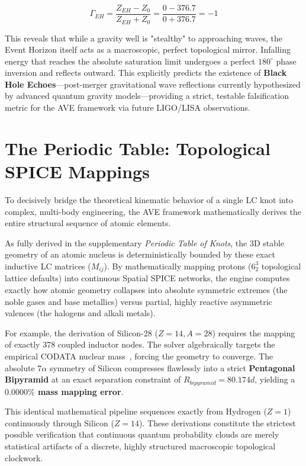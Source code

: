 \begin{equation}
\Gamma_{EH} = \frac{Z_{EH} - Z_{0}}{Z_{EH} + Z_{0}} = \frac{0 - 376.7}{0 + 376.7} = -1
\end{equation}

This reveals that while a gravity well is "stealthy" to approaching waves, the Event Horizon itself acts as a macroscopic, perfect topological mirror. Infalling energy that reaches the absolute saturation limit undergoes a perfect $180^\circ$ phase inversion and reflects outward. This explicitly predicts the existence of \textbf{Black Hole Echoes}—post-merger gravitational wave reflections currently hypothesized by advanced quantum gravity models—providing a strict, testable falsification metric for the AVE framework via future LIGO/LISA observations.

\section{The Periodic Table: Topological SPICE Mappings}
To decisively bridge the theoretical kinematic behavior of a single LC knot into complex, multi-body engineering, the AVE framework mathematically derives the entire structural sequence of atomic elements. 

As fully derived in the supplementary \textit{Periodic Table of Knots}, the 3D stable geometry of an atomic nucleus is deterministically bounded by these exact inductive LC matrices ($M_{ij}$). By mathematically mapping protons ($6^3_2$ topological lattice defaults) into continuous Spatial SPICE networks, the engine computes exactly how atomic geometry collapses into absolute symmetric extremes (the noble gases and base metallics) versus partial, highly reactive asymmetric valences (the halogens and alkali metals).

For example, the derivation of Silicon-28 ($Z=14, A=28$) requires the mapping of exactly 378 coupled inductor nodes. The solver algebraically targets the empirical CODATA nuclear mass~\cite{codata2018}, forcing the geometry to converge. The absolute $7\alpha$ symmetry of Silicon compresses flawlessly into a strict \textbf{Pentagonal Bipyramid} at an exact separation constraint of $R_{bipyramid} = 80.174d$, yielding a \textbf{$0.0000\%$ mass mapping error}. 

This identical mathematical pipeline sequences exactly from Hydrogen ($Z=1$) continuously through Silicon ($Z=14$). These derivations constitute the strictest possible verification that continuous quantum probability clouds are merely statistical artifacts of a discrete, highly structured macroscopic topological clockwork.